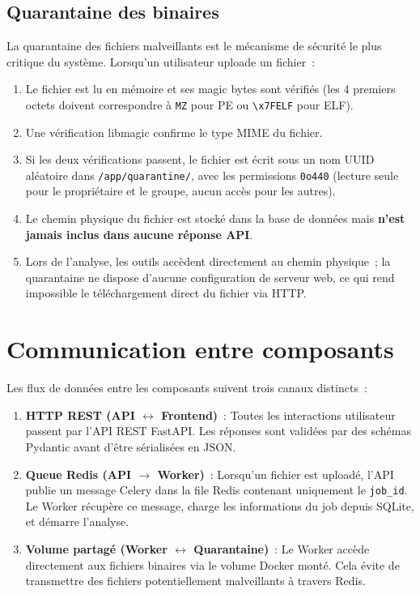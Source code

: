 \subsection{Quarantaine des binaires}

La quarantaine des fichiers malveillants est le mécanisme de sécurité le plus critique du système. Lorsqu'un utilisateur uploade un fichier~:
\begin{enumerate}
  \item Le fichier est lu en mémoire et ses magic bytes sont vérifiés (les 4 premiers octets doivent correspondre à \texttt{MZ} pour PE ou \texttt{\textbackslash x7FELF} pour ELF).
  \item Une vérification libmagic confirme le type MIME du fichier.
  \item Si les deux vérifications passent, le fichier est écrit sous un nom UUID aléatoire dans \texttt{/app/quarantine/}, avec les permissions \texttt{0o440} (lecture seule pour le propriétaire et le groupe, aucun accès pour les autres).
  \item Le chemin physique du fichier est stocké dans la base de données mais \textbf{n'est jamais inclus dans aucune réponse API}.
  \item Lors de l'analyse, les outils accèdent directement au chemin physique~; la quarantaine ne dispose d'aucune configuration de serveur web, ce qui rend impossible le téléchargement direct du fichier via HTTP.
\end{enumerate}

\section{Communication entre composants}

Les flux de données entre les composants suivent trois canaux distincts~:

\begin{enumerate}
  \item \textbf{HTTP REST (API $\leftrightarrow$ Frontend)}~: Toutes les interactions utilisateur passent par l'API REST FastAPI. Les réponses sont validées par des schémas Pydantic avant d'être sérialisées en JSON.

  \item \textbf{Queue Redis (API $\rightarrow$ Worker)}~: Lorsqu'un fichier est uploadé, l'API publie un message Celery dans la file Redis contenant uniquement le \texttt{job\_id}. Le Worker récupère ce message, charge les informations du job depuis SQLite, et démarre l'analyse.

  \item \textbf{Volume partagé (Worker $\leftrightarrow$ Quarantaine)}~: Le Worker accède directement aux fichiers binaires via le volume Docker monté. Cela évite de transmettre des fichiers potentiellement malveillants à travers Redis.
\end{enumerate}

